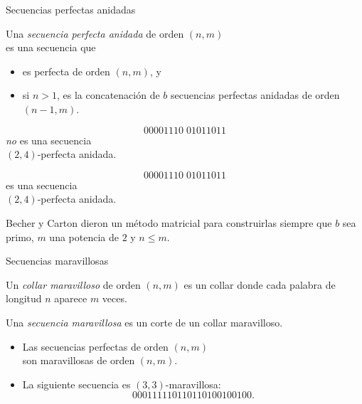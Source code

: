 \documentclass[spanish,xcolor={table}]{beamer}
\begin{document}
\begin{frame}{Secuencias perfectas anidadas}

\begin{definition}
  Una \emph{secuencia perfecta anidada} de orden $(n,m)$ \\
  es una secuencia que
  \begin{itemize}
    \item es perfecta de orden $(n,m)$, y
    \item si $n > 1$, es la concatenación de $b$ secuencias perfectas anidadas
    de orden $(n-1, m)$.
  \end{itemize}
\end{definition}
\pause

\begin{examples}
  \vspace{-1.2em}
  \begin{multicols}{2}
    \[ 00001110 \; 01011011 \]
    \emph{no} es una secuencia \\ $(2,4)$-perfecta anidada.

    \columnbreak

    \[ 00001110 \; 01011011 \]
    es una secuencia \\ $(2,4)$-perfecta anidada.
  \end{multicols}
\end{examples}

\medskip
\pause

Becher y Carton dieron un método matricial para construirlas siempre
que $b$ sea primo, $m$ una potencia de $2$ y $n \leq m$.
\end{frame}


\begin{frame}{Secuencias maravillosas}

\begin{definition}
  Un \emph{collar maravilloso} de orden $(n,m)$ es un collar donde cada palabra de longitud $n$ aparece $m$ veces.

  \medskip

  Una \emph{secuencia maravillosa} es un corte de un collar maravilloso.
\end{definition}
\pause

\begin{examples}
  \begin{itemize}
  \item Las secuencias perfectas de orden $(n,m)$ \\
  son maravillosas de orden $(n,m)$.
  \item La siguiente secuencia es $(3,3)$-maravillosa: \vspace{-.5em}
  \[ 000111110110110100100100. \]
  \end{itemize}
\end{examples}

\end{frame}
\end{document}

